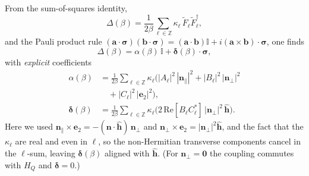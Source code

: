 From the sum-of-squares identity,
\begin{equation}
    \Delta(\beta)
    =
    \frac{1}{2\beta}\sum_{\ell\in\mathbb Z}\kappa_\ell\,\tilde F_\ell \tilde F_\ell^\dagger,
    \label{eq:Delta_sumsq_recalled_addon}
\end{equation}
and the Pauli product rule
$(\mathbf a\cdot\boldsymbol\sigma)(\mathbf b\cdot\boldsymbol\sigma)
=(\mathbf a\cdot\mathbf b)\mathbb I+i(\mathbf a\times\mathbf b)\cdot\boldsymbol\sigma$,
one finds
\begin{equation}
    \Delta(\beta)=\alpha(\beta)\,\mathbb I + \boldsymbol\delta(\beta)\cdot\boldsymbol\sigma,
    \label{eq:Delta_alpha_delta}
\end{equation}
with \emph{explicit} coefficients
\begin{align}
    \alpha(\beta)
    &=
    \frac{1}{2\beta}\sum_{\ell\in\mathbb Z}\kappa_\ell
    \Big(
        |A_\ell|^2\,|\mathbf n_\parallel|^2
        + |B_\ell|^2\,|\mathbf n_\perp|^2 \nonumber\\
        &\quad + |C_\ell|^2\,|\mathbf e_2|^2
    \Big),
    \label{eq:alpha_explicit}\\[4pt]
    \boldsymbol\delta(\beta)
    &=
    \frac{1}{2\beta}\sum_{\ell\in\mathbb Z}\kappa_\ell
    \Big(
        2\,\mathrm{Re}[B_\ell C_\ell^*]\,
        |\mathbf n_\perp|^2\,\hat{\mathbf h}
    \Big).
    \label{eq:delta_explicit}
\end{align}
Here we used $\mathbf n_\parallel\times \mathbf e_2 = -(\mathbf n\cdot\hat{\mathbf h})\,\mathbf n_\perp$ and
$\mathbf n_\perp\times \mathbf e_2 = |\mathbf n_\perp|^2\hat{\mathbf h}$, and the fact that the $\kappa_\ell$ are real and even in $\ell$,
so the non-Hermitian transverse components cancel in the $\ell$-sum, leaving $\boldsymbol\delta(\beta)$ aligned with $\hat{\mathbf h}$.
(For $\mathbf n_\perp=\mathbf 0$ the coupling commutes with $H_Q$ and $\boldsymbol\delta=0$.)

